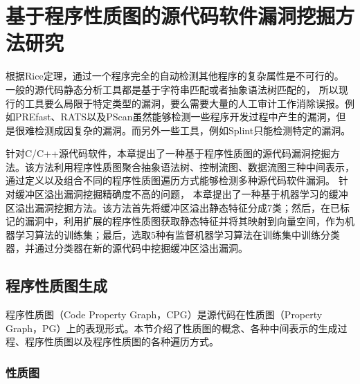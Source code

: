 \chapter{基于程序性质图的源代码软件漏洞挖掘方法研究}

根据Rice定理，通过一个程序完全的自动检测其他程序的复杂属性是不可行的。
一般的源代码静态分析工具都是基于字符串匹配或者抽象语法树匹配的，
所以现行的工具要么局限于特定类型的漏洞，要么需要大量的人工审计工作消除误报。例如PREfast、RATS以及PScan虽然能够检测一些程序开发过程中产生的漏洞，但是很难检测成因复杂的漏洞。而另外一些工具，例如Splint只能检测特定的漏洞。


针对C/C++源代码软件，本章提出了一种基于程序性质图的源代码漏洞挖掘方法。该方法利用程序性质图聚合抽象语法树、控制流图、数据流图三种中间表示，通过定义以及组合不同的程序性质图遍历方式能够检测多种源代码软件漏洞。
针对缓冲区溢出漏洞挖掘精确度不高的问题，
本章提出了一种基于机器学习的缓冲区溢出漏洞挖掘方法。该方法首先将缓冲区溢出静态特征分成7类；然后，在已标记的漏洞中，利用扩展的程序性质图获取静态特征并将其映射到向量空间，作为机器学习算法的训练集；最后，选取5种有监督机器学习算法在训练集中训练分类器，并通过分类器在新的源代码中挖掘缓冲区溢出漏洞。

\section{程序性质图生成}\label{程序性质图生成}

程序性质图（Code Property Graph，CPG）是源代码在性质图（Property Graph，PG）上的表现形式。本节介绍了性质图的概念、各种中间表示的生成过程、程序性质图以及程序性质图的各种遍历方式。

\subsection{性质图}

